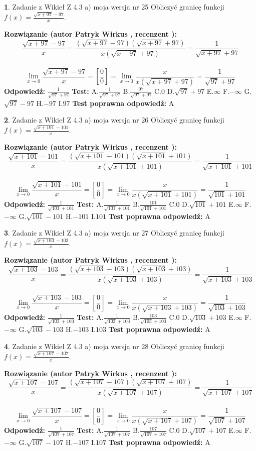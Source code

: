 \documentclass[12pt, a4paper]{article}
\theoremstyle{definition} %
\newtheorem{zad}{}
\newcommand{\zadStart}[1]{\begin{zad}#1\newline}
\newcommand{\zadStop}{\end{zad}}
\newcommand{\rozwStart}[2]{\noindent \textbf{Rozwiązanie (autor #1 , recenzent #2): }\newline}
\newcommand{\rozwStop}{\newline}
\newcommand{\odpStart}{\noindent \textbf{Odpowiedź:}\newline}
\newcommand{\odpStop}{\newline}
\newcommand{\testStart}{\noindent \textbf{Test:}\newline}
\newcommand{\testStop}{\newline}
\newcommand{\kluczStart}{\noindent \textbf{Test poprawna odpowiedź:}\newline}
\newcommand{\kluczStop}{\newline}
\begin{document}
\zadStart{Zadanie z Wikieł Z 4.3 a) moja wersja nr 25}
Obliczyć granicę funkcji $f(x)=\frac{\sqrt{x+97}-97}{x}$.
\zadStop
\rozwStart{Patryk Wirkus}{}
$$\frac{\sqrt{x+97}-97}{x}=\frac{(\sqrt{x+97}-97)(\sqrt{x+97}+97)}{x(\sqrt{x+97}+97)}=\frac{1}{\sqrt{x+97}+97}$$
\\
$$\lim\limits_{x\to0}\frac{\sqrt{x+97}-97}{x}=[\frac{0}{0}]=
\lim\limits_{x\to0}\frac{x}{x(\sqrt{x+97}+97)} = \frac{1}{\sqrt{97}+97}$$
\rozwStop
\odpStart
$\frac{1}{\sqrt{97}+97}$
\odpStop
\testStart
A.$\frac{1}{\sqrt{97}+97}$
B.$\frac{97}{\sqrt{97}+97}$
C.$0$
D.$\sqrt{97}+97$
E.$\infty$
F.$-\infty$
G.$\sqrt{97}-97$
H.$-97$
I.$97$
\testStop
\kluczStart
A
\kluczStop



\zadStart{Zadanie z Wikieł Z 4.3 a) moja wersja nr 26}
Obliczyć granicę funkcji $f(x)=\frac{\sqrt{x+101}-101}{x}$.
\zadStop
\rozwStart{Patryk Wirkus}{}
$$\frac{\sqrt{x+101}-101}{x}=\frac{(\sqrt{x+101}-101)(\sqrt{x+101}+101)}{x(\sqrt{x+101}+101)}=\frac{1}{\sqrt{x+101}+101}$$
\\
$$\lim\limits_{x\to0}\frac{\sqrt{x+101}-101}{x}=[\frac{0}{0}]=
\lim\limits_{x\to0}\frac{x}{x(\sqrt{x+101}+101)} = \frac{1}{\sqrt{101}+101}$$
\rozwStop
\odpStart
$\frac{1}{\sqrt{101}+101}$
\odpStop
\testStart
A.$\frac{1}{\sqrt{101}+101}$
B.$\frac{101}{\sqrt{101}+101}$
C.$0$
D.$\sqrt{101}+101$
E.$\infty$
F.$-\infty$
G.$\sqrt{101}-101$
H.$-101$
I.$101$
\testStop
\kluczStart
A
\kluczStop



\zadStart{Zadanie z Wikieł Z 4.3 a) moja wersja nr 27}
Obliczyć granicę funkcji $f(x)=\frac{\sqrt{x+103}-103}{x}$.
\zadStop
\rozwStart{Patryk Wirkus}{}
$$\frac{\sqrt{x+103}-103}{x}=\frac{(\sqrt{x+103}-103)(\sqrt{x+103}+103)}{x(\sqrt{x+103}+103)}=\frac{1}{\sqrt{x+103}+103}$$
\\
$$\lim\limits_{x\to0}\frac{\sqrt{x+103}-103}{x}=[\frac{0}{0}]=
\lim\limits_{x\to0}\frac{x}{x(\sqrt{x+103}+103)} = \frac{1}{\sqrt{103}+103}$$
\rozwStop
\odpStart
$\frac{1}{\sqrt{103}+103}$
\odpStop
\testStart
A.$\frac{1}{\sqrt{103}+103}$
B.$\frac{103}{\sqrt{103}+103}$
C.$0$
D.$\sqrt{103}+103$
E.$\infty$
F.$-\infty$
G.$\sqrt{103}-103$
H.$-103$
I.$103$
\testStop
\kluczStart
A
\kluczStop



\zadStart{Zadanie z Wikieł Z 4.3 a) moja wersja nr 28}
Obliczyć granicę funkcji $f(x)=\frac{\sqrt{x+107}-107}{x}$.
\zadStop
\rozwStart{Patryk Wirkus}{}
$$\frac{\sqrt{x+107}-107}{x}=\frac{(\sqrt{x+107}-107)(\sqrt{x+107}+107)}{x(\sqrt{x+107}+107)}=\frac{1}{\sqrt{x+107}+107}$$
\\
$$\lim\limits_{x\to0}\frac{\sqrt{x+107}-107}{x}=[\frac{0}{0}]=
\lim\limits_{x\to0}\frac{x}{x(\sqrt{x+107}+107)} = \frac{1}{\sqrt{107}+107}$$
\rozwStop
\odpStart
$\frac{1}{\sqrt{107}+107}$
\odpStop
\testStart
A.$\frac{1}{\sqrt{107}+107}$
B.$\frac{107}{\sqrt{107}+107}$
C.$0$
D.$\sqrt{107}+107$
E.$\infty$
F.$-\infty$
G.$\sqrt{107}-107$
H.$-107$
I.$107$
\testStop
\kluczStart
A
\kluczStop
\end{document}
